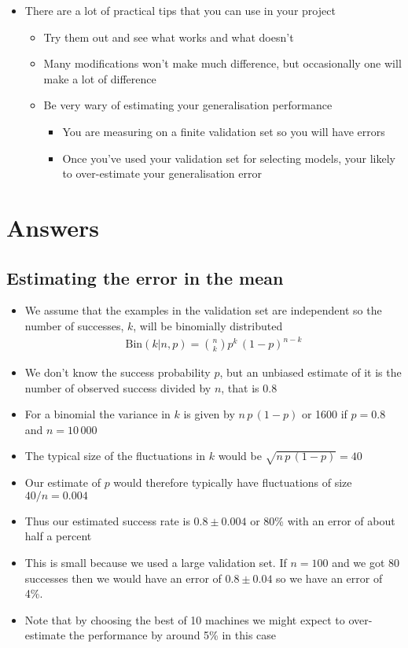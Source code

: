 \documentclass[11pt]{article}
\begin{document}
\begin{itemize}
\item There are a lot of practical tips that you can use in your project
\begin{itemize}
\item Try them out and see what works and what doesn't
\item Many modifications won't make much difference, but occasionally one
will make a lot of difference
\item Be very wary of estimating your generalisation performance
\begin{itemize}
\item You are measuring on a finite validation set so you will have errors
\item Once you've used your validation set for selecting models,
your likely to over-estimate your generalisation error
\end{itemize}
\end{itemize}
\end{itemize}


\section{Answers}
\label{sec:org508ace0}

\subsection{Estimating the error in the mean}
\label{sec:org0766564}

\begin{itemize}
\item We assume that the examples in the validation set are independent so
the number of successes, \(k\), will be binomially distributed
\begin{align*}
 \mathrm{Bin}(k|n,p) = \binom{n}{k} p^k\,(1-p)^{n-k}
\end{align*}
\item We don't know the success probability \(p\), but an unbiased estimate of
it is the number of observed success divided by \(n\), that is \(0.8\)
\item For a binomial the variance in \(k\) is given by \(n\,p\,(1-p)\) or 1600 
if \(p=0.8\) and \(n=10\,000\)
\item The typical size of the fluctuations in \(k\) would be \(\sqrt{n\,p\,(1-p)}=40\)
\item Our estimate of \(p\) would therefore typically have fluctuations
of size \(40/n =0.004\)
\item Thus our estimated success rate is \(0.8\pm0.004\) or 80\% with an error 
of about half a percent
\item This is small because we used a large validation set.  If \(n=100\) and
we got 80 successes then we would have an error of \(0.8\pm0.04\) so we have
an error of 4\%.
\item Note that by choosing the best of 10 machines we might expect to 
over-estimate the performance by around 5\% in this case
\end{itemize}
\end{document}
